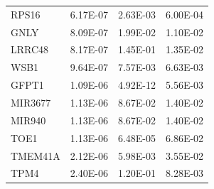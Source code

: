 \begin{longtable}{lrrr}
RPS16 & 6.17E-07 & 2.63E-03 & 6.00E-04\\
GNLY & 8.09E-07 & 1.99E-02 & 1.10E-02\\
LRRC48 & 8.17E-07 & 1.45E-01 & 1.35E-02\\
WSB1 & 9.64E-07 & 7.57E-03 & 6.63E-03\\
GFPT1 & 1.09E-06 & 4.92E-12 & 5.56E-03\\
MIR3677 & 1.13E-06 & 8.67E-02 & 1.40E-02\\
MIR940 & 1.13E-06 & 8.67E-02 & 1.40E-02\\
TOE1 & 1.13E-06 & 6.48E-05 & 6.86E-02\\
TMEM41A & 2.12E-06 & 5.98E-03 & 3.55E-02\\
TPM4 & 2.40E-06 & 1.20E-01 & 8.28E-03\\
\end{longtable}
\endgroup

